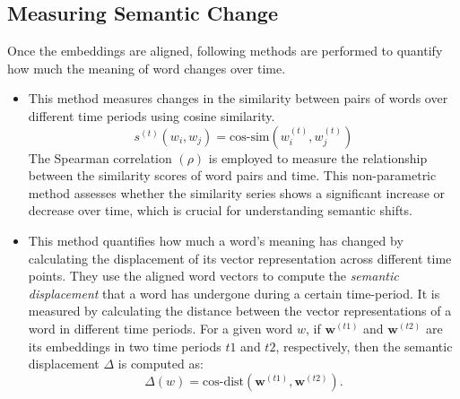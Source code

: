\subsection{Measuring Semantic Change}\label{subsec:measuring-semantic-change}
Once the embeddings are aligned, following methods are performed to quantify how much the meaning of word changes over time.
\begin{itemize}
    \item {}
        This method measures changes in the similarity between pairs of words over different time periods using cosine similarity.
        \begin{equation}
            s^{(t)}(w_i, w_j) = \text{cos-sim}(w_i^{(t)}, w_j^{(t)})
            \label{eq:equation2}
        \end{equation}
        The Spearman correlation $(\rho)$ is employed to measure the relationship between the similarity scores of word pairs and time.
        This non-parametric method assesses whether the similarity series shows a significant increase or decrease over time, which is crucial for understanding semantic shifts.

    \item {}
        This method quantifies how much a word's meaning has changed by calculating the displacement of its vector representation across different time points.
        They use the aligned word vectors to compute the \emph{semantic displacement} that a word has undergone during a certain time-period.
        It is measured by calculating the distance between the vector representations of a word in different time periods.
        For a given word $w$, if $\mathbf{w}^{(t1)}$ and $\mathbf{w}^{(t2)}$ are its embeddings in two time periods $t1$ and $t2$, respectively, then the semantic displacement $\Delta$ is computed as:
        \begin{equation}
            \Delta(w) = \text{cos-dist}(\mathbf{w}^{(t1)}, \mathbf{w}^{(t2)}).\label{eq:equation3}
        \end{equation}
\end{itemize}


